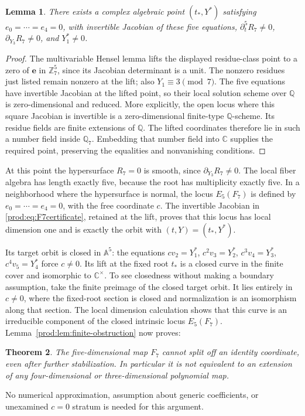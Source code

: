 \documentclass[11pt]{article}
\numberwithin{equation}{section}
\theoremstyle{plain}
\newtheorem{theorem}{Theorem}[section]
\newtheorem{lemma}[theorem]{Lemma}
\theoremstyle{definition}
\theoremstyle{remark}
\newcommand{\C}{\mathbb{C}}
\newcommand{\A}{\mathbb{A}}
\begin{document}
\begin{lemma}\label{prod:lem:Henselpoint}
There exists a complex algebraic point $(t_*,Y^*)$ satisfying
$e_0=\cdots=e_4=0$, with invertible Jacobian of these five equations,
$\partial_t^5R_7\ne0$, $\partial_{Y_3}R_7\ne0$, and $Y_1^*\ne0$.
\end{lemma}
\begin{proof}
The multivariable Hensel lemma \cite{ConradHensel} lifts the displayed
residue-class point to a zero of $\mathbf e$ in $\mathbb Z_7^5$, since its
Jacobian determinant is a unit. The nonzero residues just listed remain
nonzero at the lift; also $Y_1\equiv3\pmod7$. The five equations have
invertible Jacobian at the lifted point, so their local solution scheme
over $\mathbb Q$ is zero-dimensional and reduced. More explicitly, the
open locus where this square Jacobian is invertible is a zero-dimensional
finite-type $\mathbb Q$-scheme. Its residue fields are finite extensions
of $\mathbb Q$. The lifted coordinates therefore lie in such a number
field inside $\mathbb Q_7$. Embedding that number field into $\C$ supplies
the required point, preserving the equalities and nonvanishing conditions.
\end{proof}

At this point the hypersurface $R_7=0$ is smooth, since
$\partial_{Y_3}R_7\ne0$. The local fiber algebra has length exactly five,
because the root has multiplicity exactly five. In a neighborhood where
the hypersurface is normal, the locus $E_5(F_7)$ is defined by
$e_0=\cdots=e_4=0$, with the free coordinate $c$. The invertible Jacobian
in \eqref{prod:eq:F7certificate}, retained at the lift, proves that this locus
has local dimension one and is exactly the orbit with $(t,Y)=(t_*,Y^*)$.

Its target orbit is closed in $\A^5$: the equations
$cv_2=Y_1^*$, $c^2v_3=Y_2^*$, $c^3v_4=Y_3^*$, $c^4v_5=Y_4^*$
force $c\ne0$. Its lift at the fixed root $t_*$ is a closed curve in the
finite cover and isomorphic to $\C^\times$. To see closedness without
making a boundary assumption, take the finite preimage of the closed
target orbit. It lies entirely in $c\ne0$, where the fixed-root section
is closed and normalization is an isomorphism along that section.
The local dimension calculation shows that this curve is an irreducible
component of the closed intrinsic locus $E_5(F_7)$.
Lemma~\ref{prod:lem:finite-obstruction} now proves:
\begin{theorem}\label{prod:thm:F7-complete}
The five-dimensional map $F_7$ cannot split off an identity coordinate,
even after further stabilization. In particular it is not equivalent to
an extension of any four-dimensional or three-dimensional polynomial map.
\end{theorem}
No numerical approximation, assumption about generic coefficients, or
unexamined $c=0$ stratum is needed for this argument.
\end{document}
